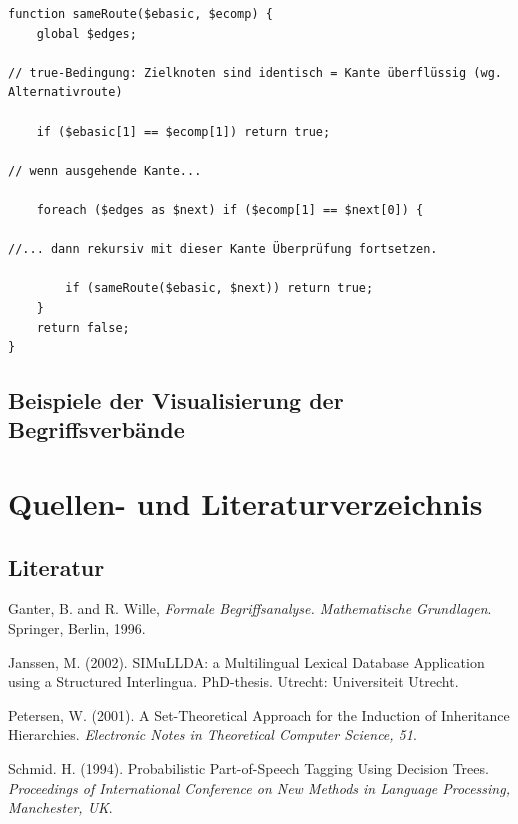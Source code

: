 \documentclass[pagesize,paper=A4,DIV=calc,fontsize=12pt,draft=false]{scrreprt}
\begin{document}
\lstset{
language=PHP
}

\begin{lstlisting}[caption={Überprüfung, ob \texttt{\$ecomp} über andere ausgehende Kanten zum Zielknoten von \texttt{\$ebasic} führt.}]
function sameRoute($ebasic, $ecomp) {
    global $edges;

// true-Bedingung: Zielknoten sind identisch = Kante überflüssig (wg. Alternativroute)

    if ($ebasic[1] == $ecomp[1]) return true;

// wenn ausgehende Kante...

    foreach ($edges as $next) if ($ecomp[1] == $next[0]) {

//... dann rekursiv mit dieser Kante Überprüfung fortsetzen.
		
        if (sameRoute($ebasic, $next)) return true; 
    }
    return false;
}
\end{lstlisting}

\section{Beispiele der Visualisierung der Begriffsverbände}



\chapter{Quellen- und Literaturverzeichnis}

\section{Literatur}

Ganter, B. and R. Wille, \emph{Formale Begriffsanalyse. Mathematische Grundlagen}. Springer, Berlin, 1996.

Janssen, M. (2002). SIMuLLDA: a Multilingual Lexical Database Application using a Structured Interlingua. PhD-thesis. Utrecht: Universiteit Utrecht.

Petersen, W. (2001). A Set-Theoretical Approach for the Induction of Inheritance Hierarchies. \emph{Electronic Notes in Theoretical Computer Science, 51}.

Schmid. H. (1994). Probabilistic Part-of-Speech Tagging Using Decision Trees. \emph{Proceedings of International Conference on New Methods in Language Processing, Manchester, UK}.
\end{document}
